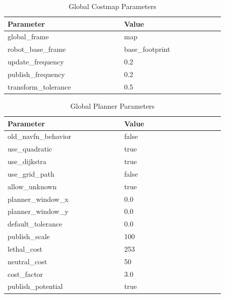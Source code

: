 \begin{table*}[ht]
    \caption{Global Costmap Parameters}
    \centering
    \begin{tabular}{p{0.25\linewidth}p{0.25\linewidth}}
        \hline
        Parameter & Value \\
        \hline
        global\_frame & map \\
        robot\_base\_frame & base\_footprint \\
        update\_frequency & 0.2 \\
        publish\_frequency & 0.2 \\
        transform\_tolerance & 0.5 \\
    \end{tabular}
\end{table*}

\begin{table*}[ht]
    \caption{Global Planner Parameters}
    \centering
    \begin{tabular}{p{0.25\linewidth}p{0.25\linewidth}}
        \hline
        Parameter & Value \\
        \hline
        old\_navfn\_behavior & false \\
        use\_quadratic & true \\
        use\_dijkstra & true \\
        use\_grid\_path & false \\
        allow\_unknown & true \\
        planner\_window\_x & 0.0 \\
        planner\_window\_y & 0.0 \\
        default\_tolerance & 0.0 \\
        publish\_scale & 100 \\
        lethal\_cost & 253 \\
        neutral\_cost & 50 \\
        cost\_factor & 3.0 \\
        publish\_potential & true \\
     \end{tabular}   
\end{table*}

